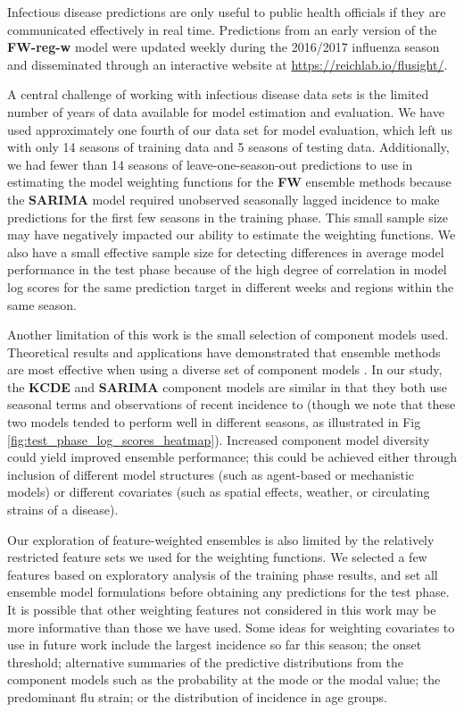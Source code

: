\documentclass[10pt,letterpaper]{article}
\begin{document}
Infectious disease predictions are only useful to public health
officials if they are communicated effectively in real time. Predictions
from an early version of the \textbf{FW-reg-w} model were updated weekly
during the 2016/2017 influenza season and disseminated through an
interactive website at \url{https://reichlab.io/flusight/}.

A central challenge of working with infectious disease data sets is the
limited number of years of data available for model estimation and
evaluation. We have used approximately one fourth of our data set for
model evaluation, which left us with only 14 seasons of training data
and 5 seasons of testing data. Additionally, we had fewer than 14
seasons of leave-one-season-out predictions to use in estimating the
model weighting functions for the \textbf{FW} ensemble methods because
the \textbf{SARIMA} model required unobserved seasonally lagged
incidence to make predictions for the first few seasons in the training
phase. This small sample size may have negatively impacted our ability
to estimate the weighting functions. We also have a small effective
sample size for detecting differences in average model performance in
the test phase because of the high degree of correlation in model log
scores for the same prediction target in different weeks and regions
within the same season.

Another limitation of this work is the small selection of component
models used. Theoretical results and applications have demonstrated that
ensemble methods are most effective when using a diverse set of
component models \cite{polikar2006ensemble}. In our study, the
\textbf{KCDE} and \textbf{SARIMA} component models are similar in that
they both use seasonal terms and observations of recent incidence to
(though we note that these two models tended to perform well in
different seasons, as illustrated in Fig
\ref{fig:test_phase_log_scores_heatmap}). Increased component model
diversity could yield improved ensemble performance; this could be
achieved either through inclusion of different model structures (such as
agent-based or mechanistic models) or different covariates (such as
spatial effects, weather, or circulating strains of a disease).

Our exploration of feature-weighted ensembles is also limited by the
relatively restricted feature sets we used for the weighting functions.
We selected a few features based on exploratory analysis of the training
phase results, and set all ensemble model formulations before obtaining
any predictions for the test phase. It is possible that other weighting
features not considered in this work may be more informative than those
we have used. Some ideas for weighting covariates to use in future work
include the largest incidence so far this season; the onset threshold;
alternative summaries of the predictive distributions from the component
models such as the probability at the mode or the modal value; the
predominant flu strain; or the distribution of incidence in age groups.
\end{document}
